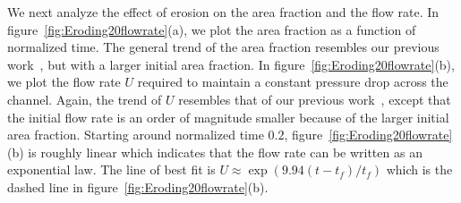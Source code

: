 \documentclass{jfm}
\begin{document}
We next analyze the effect of erosion on the area fraction and the flow
rate.  In figure~\ref{fig:Eroding20flowrate}(a), we plot the area
fraction as a function of normalized time.  The general trend of the
area fraction resembles our previous work~\citep[see][figure
10(a)]{qua-moo2018}, but with a larger initial area fraction.  In
figure~\ref{fig:Eroding20flowrate}(b), we plot the flow rate $U$
required to maintain a constant pressure drop across the channel.
Again, the trend of $U$ resembles that of our previous
work~\citep[see][figure 10(b)]{qua-moo2018}, except that the initial
flow rate is an order of magnitude smaller because of the larger initial
area fraction.  Starting around normalized time $0.2$,
figure~\ref{fig:Eroding20flowrate}(b) is roughly linear which indicates
that the flow rate can be written as an exponential law.  The line of
best fit is $U \approx \exp(9.94(t-t_f)/t_f)$
which is the dashed line in figure~\ref{fig:Eroding20flowrate}(b).
\end{document}
